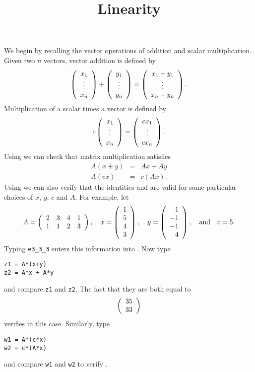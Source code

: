 \documentclass{ximera}
\title{Linearity}
\begin{document}
\begin{abstract}
\end{abstract}
\maketitle

  \label{S:linearity}

We begin by recalling the vector operations of addition and
scalar multiplication.  Given two $n$ vectors, vector addition
 is defined by
\[
\left(\begin{array}{c} x_1 \\ \vdots \\ x_{n}\end{array}\right)+\left(\begin{array}{c} y_1 \\ \vdots \\ y_{n}\end{array}\right)=\left(\begin{array}{c} x_1+y_1 \\ \vdots \\
x_n+y_n\end{array}\right).
\]
Multiplication of a scalar  times a vector
is defined by
\[
c\left(\begin{array}{c} x_1 \\ \vdots \\ x_{n}\end{array}\right) = \left(\begin{array}{c} cx_1 \\ \vdots \\ cx_{n}\end{array}\right).
\]
Using  we can check that matrix multiplication
satisfies
\begin{eqnarray}
A(x+y) & = & Ax + Ay \label{sum} \\
A(cx) & = & c(Ax). \label{product}
\end{eqnarray}
Using \Matlab we can also verify that the identities 
and  are valid for some particular choices of $x$,
$y$, $c$ and $A$.  For example, let
\begin{equation*}
A = \left(\begin{array}{cccc} 2 & 3 & 4 & 1\\ 1 & 1 & 2 & 3
\end{array}\right), \quad x = \left(\begin{array}{r} 1 \\ 5 \\ 4 \\
3 \end{array}\right), \quad y = \left(\begin{array}{r} 1 \\ -1 \\ -1 \\
4 \end{array}\right), \quad\mbox{and}\quad c=5.
\end{equation*}
Typing {\tt e3\_3\_3} enters this information into \Matlabp.  Now
type
\begin{verbatim}
z1 = A*(x+y)
z2 = A*x + A*y
\end{verbatim}
and compare {\tt z1} and {\tt z2}.  The fact that they are both
equal to
\[
\left(\begin{array}{r} 35 \\ 33\end{array}\right)
\]
verifies  in this case.  Similarly, type
\begin{verbatim}
w1 = A*(c*x)
w2 = c*(A*x)
\end{verbatim}
and compare {\tt w1} and {\tt w2} to verify .
\end{document}
